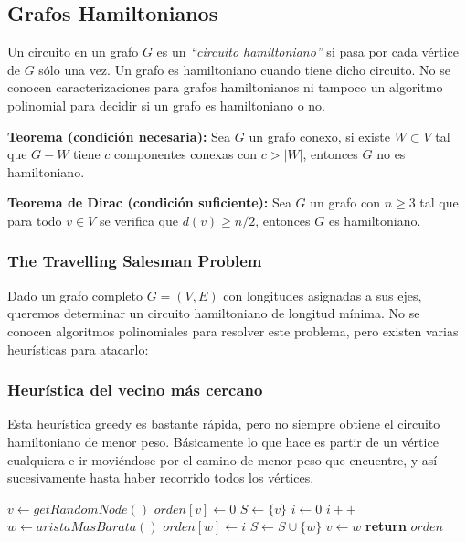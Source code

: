 \newpage
\subsection{Grafos Hamiltonianos}

Un circuito en un grafo $G$ es un \emph{``circuito hamiltoniano''} si pasa por cada v\'ertice de $G$ s\'olo una vez. Un grafo es hamiltoniano cuando tiene dicho circuito. No se conocen caracterizaciones para grafos hamiltonianos ni tampoco un algoritmo polinomial para decidir si un grafo es hamiltoniano o no.

\newenvironment{badidea}
  {\par\leftskip=1cm}
  {\par}

\begin{badidea}
\textbf{Teorema (condici\'on necesaria):} Sea $G$ un grafo conexo, si existe $W \subset V$ tal que $G - W$ tiene $c$ componentes conexas con $c > |W|$, entonces $G$ no es hamiltoniano.
\end{badidea}

\begin{badidea}
\textbf{Teorema de Dirac (condici\'on suficiente):} Sea $G$ un grafo con $n \geq 3$ tal que para todo $v \in V$ se verifica que $d(v) \geq n/2$, entonces $G$ es hamiltoniano.
\end{badidea}

\subsubsection{The Travelling Salesman Problem}

Dado un grafo completo $G = (V, E)$ con longitudes asignadas a sus ejes, queremos determinar un circuito hamiltoniano de longitud m\'inima. No se conocen algoritmos polinomiales para resolver este problema, pero existen varias heur\'isticas para atacarlo:

\subsubsection*{Heur\'istica del vecino m\'as cercano}

Esta heur\'istica greedy es bastante r\'apida, pero no siempre obtiene el circuito hamiltoniano de menor peso. B\'asicamente lo que hace es partir de un v\'ertice cualquiera e ir movi\'endose por el camino de menor peso que encuentre, y as\'i sucesivamente hasta haber recorrido todos los v\'ertices.

\begin{algorithm}
\begin{algorithmic}[1]
  \State $v \gets getRandomNode()$
  \State $orden[v] \gets 0$
  \State $S \gets \{v\}$
  \State $i \gets 0$
    \State $i++$
    \State $w \gets aristaMasBarata()$
    \State $orden[w] \gets i$
    \State $S \gets S \cup \{ w \}$
    \State $v \gets w$
  \EndWhile
  \State \textbf{return} $orden$
\EndFunction
\end{algorithmic}
\end{algorithm}

